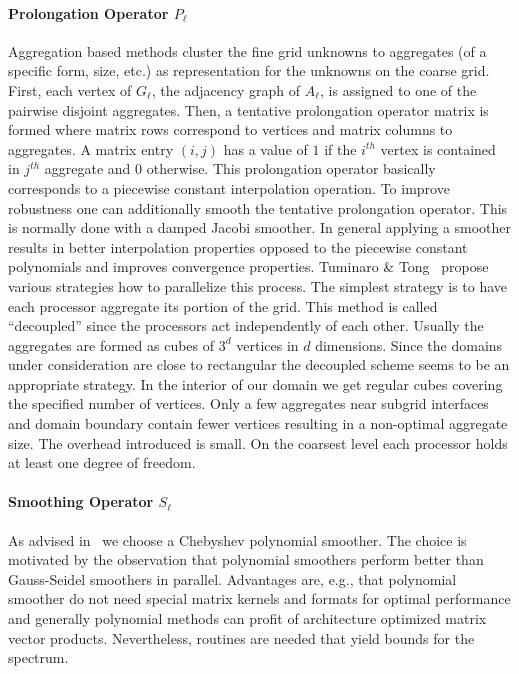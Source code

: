 \paragraph{Prolongation Operator $P_\ell$} Aggregation based methods
cluster the fine grid unknowns to aggregates (of a specific form, size,
etc.) as representation for the unknowns on the coarse grid.  First,
each vertex of $G_\ell$, the adjacency graph of $A_\ell$, is assigned to
one of the pairwise disjoint aggregates.  Then, a tentative prolongation
operator matrix is formed where matrix rows correspond to vertices and
matrix columns to aggregates.  A matrix entry $(i,j)$ has a value of $1$
if the $i^{th}$ vertex is contained in $j^{th}$ aggregate and $0$
otherwise.  This prolongation operator basically corresponds to a
piecewise constant interpolation operation.  To improve robustness one
can additionally smooth the tentative prolongation operator. This is
normally done with a damped Jacobi smoother.  In general applying a
smoother results in better interpolation properties opposed to the
piecewise constant polynomials and improves convergence properties.
Tuminaro \& Tong~\cite{tuto:00} propose various strategies how to
parallelize this process.  The simplest strategy is to have each
processor aggregate its portion of the grid.  This method is called
``decoupled'' since the processors act independently of each other.
Usually the aggregates are formed as cubes of $3^d$ vertices in $d$
dimensions.  Since the domains under consideration are close to
rectangular the decoupled scheme seems to be an appropriate strategy.
In the interior of our domain we get regular cubes covering the
specified number of vertices.  Only a few aggregates near subgrid
interfaces and domain boundary contain fewer vertices resulting in a
non-optimal aggregate size.  The overhead introduced is small.  On the
coarsest level each processor holds at least one degree of freedom.

\paragraph{Smoothing Operator $S_\ell$} As advised in~\cite{abht:03} we
choose a Chebyshev polynomial smoother.  The choice is motivated by the
observation that polynomial smoothers perform better than Gauss-Seidel
smoothers in parallel.  Advantages are, e.g., that polynomial smoother
do not need special matrix kernels and formats for optimal performance
and generally polynomial methods can profit of architecture optimized
matrix vector products.  Nevertheless, routines are needed that yield
bounds for the spectrum.

